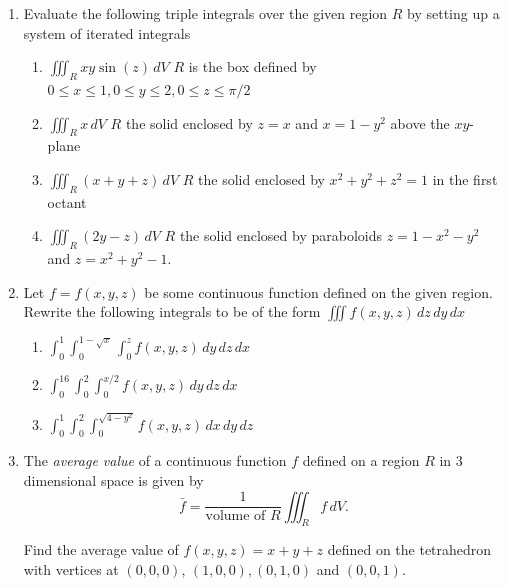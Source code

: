 \documentclass[12pt]{article}
\numberwithin{equation}{subsection}
\numberwithin{figure}{subsection}
\theoremstyle{note}
\begin{document}
{\begin{enumerate}[label=\arabic*.]
\begin{enumerate}
	\item $\displaystyle \int_0^1 \int_0^1 \int_0^3 (xy+yz+x^2) \,dx\,dy\,dz$
	\item $\displaystyle \int_0^1 \int_1^y \int_y^{x^2} 2y \,dz\,dx\,dy$
	\item $\displaystyle \int_{-1}^1 \int_z^1 \int_0^{y} \dfrac{y}{x^2+y^2} \,dx\,dy\,dz$
\end{enumerate}

\item Evaluate the following triple integrals over the given region $R$ by setting up a system of iterated integrals

\begin{enumerate}
	\item $\displaystyle \iiint_R xy \sin(z)\,dV$ \quad $R$ is the box defined by $0\leq x \leq 1, 0\leq y \leq 2, 0 \leq z \leq \pi/2$
	\item $\displaystyle \iiint_R x \,dV$ \quad  \quad $R$ the solid enclosed by $z=x$ and $x=1-y^2$ above the $xy$-plane
	\item $\displaystyle \iiint_R (x+y+z)\,dV$ \quad $R$ the solid enclosed by $x^2+y^2+z^2=1$ in the first octant
	\item $\displaystyle \iiint_R (2y-z)\,dV$ \quad $R$ the solid enclosed by paraboloids $z=1-x^2-y^2$ and $z=x^2+y^2-1$.
\end{enumerate}

\item Let $f=f(x,y,z)$ be some continuous function defined on the given region. Rewrite the following integrals to be of the form $\iiint f(x,y,z)\,dz\,dy\,dx$

\begin{enumerate}
	\item $\displaystyle \int_0^1 \int_0^{1-\sqrt{x}} \int_0^z f(x,y,z) \,dy\,dz\,dx$
	\item $\displaystyle \int_0^{16} \int_0^2 \int_0^{x/2} f(x,y,z) \,dy\,dz\,dx$
	\item $\displaystyle \int_0^1 \int_0^2 \int_0^{\sqrt{4-y^2}}f(x,y,z)\,dx\,dy\,dz$
\end{enumerate}

\item The \textit{average value} of a continuous function $f$ defined on a region $R$ in 3 dimensional space is given by \[ \bar{f}= \dfrac{1}{\text{volume of $R$}} \iiint_R f\,dV.\]

Find the average value of $f(x,y,z)=x+y+z$ defined on the tetrahedron with vertices at $(0,0,0)$, $(1,0,0), (0,1,0)$ and $(0,0,1)$.


\end{enumerate}}
\end{document}
